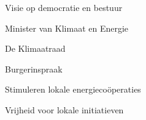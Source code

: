 
\begin{visie-concept}{Visie op democratie en bestuur}\end{visie-concept}

\begin{voorstel-concept}{Minister van Klimaat en Energie}\end{voorstel-concept}
\begin{voorstel-concept}{De Klimaatraad}\end{voorstel-concept}
\begin{voorstel-concept}{Burgerinspraak}\end{voorstel-concept}
\begin{voorstel-concept}{Stimuleren lokale energiecoöperaties}\end{voorstel-concept}
\begin{voorstel-concept}{Vrijheid voor lokale initiatieven}\end{voorstel-concept}
